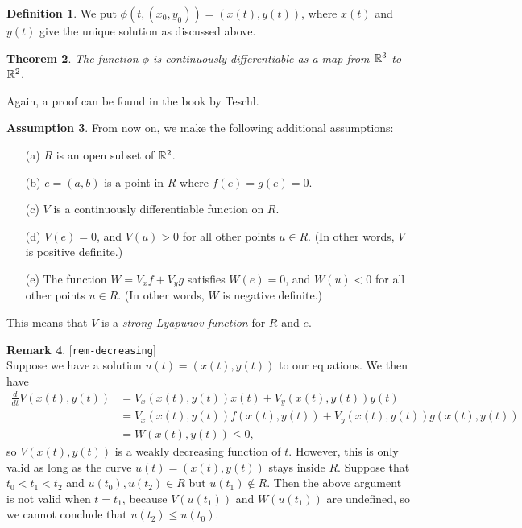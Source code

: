 \documentclass[reqno]{amsart}
\newcommand{\lbl}[1]{\label{#1}\textup{[\texttt{#1}]}\ \\}
\newcommand{\lbl}{\label}
\newtheorem{theorem}{Theorem}
\theoremstyle{definition}
\newtheorem{assumption}[theorem]{Assumption}
\newtheorem{remark}[theorem]{Remark}
\newtheorem{definition}[theorem]{Definition}
\begin{document}
\begin{definition}
 We put $\phi(t,(x_0,y_0))=(x(t),y(t))$, where $x(t)$ and $y(t)$ give
 the unique solution as discussed above.
\end{definition}

\begin{theorem}
 The function $\phi$ is continuously differentiable as a map from
 ${\mathbb{R}}^3$ to ${\mathbb{R}}^2$.
\end{theorem}
Again, a proof can be found in the book by Teschl.

\begin{assumption}
 From now on, we make the following additional assumptions:
 \begin{itemize}
  \item[(a)] $R$ is an open subset of ${\mathbb{R}}^2$.
  \item[(b)] $e=(a,b)$ is a point in $R$ where $f(e)=g(e)=0$.
  \item[(c)] $V$ is a continuously differentiable function on $R$.
  \item[(d)] $V(e)=0$, and $V(u)>0$ for all other points $u\in R$.  (In
   other words, $V$ is positive definite.)
  \item[(e)] The function $W=V_xf+V_yg$ satisfies $W(e)=0$, and $W(u)<0$
   for all other points $u\in R$.  (In other words, $W$ is negative
   definite.) 
 \end{itemize}
 This means that $V$ is a \emph{strong Lyapunov function} for $R$ and
 $e$. 
\end{assumption}

\begin{remark}\lbl{rem-decreasing}
 Suppose we have a solution $u(t)=(x(t),y(t))$ to our equations.  We
 then have 
 \begin{align*}
  \frac{d}{dt}V(x(t),y(t))
   &= V_x(x(t),y(t))\dot{x}(t) + V_y(x(t),y(t))\dot{y}(t) \\
   &= V_x(x(t),y(t))f(x(t),y(t)) + V_y(x(t),y(t))g(x(t),y(t)) \\
   &= W(x(t),y(t)) \leq 0,
 \end{align*}
 so $V(x(t),y(t))$ is a weakly decreasing function of $t$.  However,
 this is only valid as long as the curve $u(t)=(x(t),y(t))$ stays
 inside $R$.  Suppose that $t_0<t_1<t_2$ and $u(t_0),u(t_2)\in R$ but
 $u(t_1)\not\in R$.  Then the above argument is not valid when
 $t=t_1$, because $V(u(t_1))$ and $W(u(t_1))$ are undefined, so we
 cannot conclude that $u(t_2)\leq u(t_0)$.
\end{remark}
\end{document}
